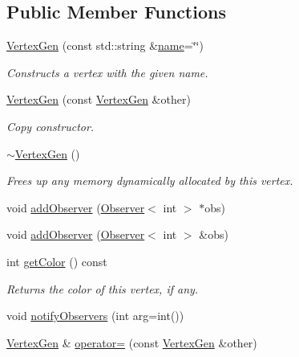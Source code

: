 \subsection*{Public Member Functions}
\begin{DoxyCompactItemize}
\item 
\mbox{\hyperlink{classVertexGen_a9432a8935c355d36bb1f64e5e17d94de}{Vertex\+Gen}} (const std\+::string \&\mbox{\hyperlink{classVertexGen_a9b45b3e13bd9167aab02e17e08916231}{name}}=\char`\"{}\char`\"{})
\begin{DoxyCompactList}\small\item\em Constructs a vertex with the given name. \end{DoxyCompactList}\item 
\mbox{\hyperlink{classVertexGen_a90c7c6069978d9c96447e2b693bd7662}{Vertex\+Gen}} (const \mbox{\hyperlink{classVertexGen}{Vertex\+Gen}} \&other)
\begin{DoxyCompactList}\small\item\em Copy constructor. \end{DoxyCompactList}\item 
\mbox{\hyperlink{classVertexGen_a7e615c7ee4f1a16998cd37bfbf0071b3}{$\sim$\+Vertex\+Gen}} ()
\begin{DoxyCompactList}\small\item\em Frees up any memory dynamically allocated by this vertex. \end{DoxyCompactList}\item 
void \mbox{\hyperlink{classObservable_a7fa6df797eb4680c2776371f2937a1b2}{add\+Observer}} (\mbox{\hyperlink{classObserver}{Observer}}$<$ int $>$ $\ast$obs)
\item 
void \mbox{\hyperlink{classObservable_a49fbc8dd9a3300429f7f575dc7ba0be8}{add\+Observer}} (\mbox{\hyperlink{classObserver}{Observer}}$<$ int $>$ \&obs)
\item 
int \mbox{\hyperlink{classVertexGen_a0a56fe92b545a9b650fe5cde9a756ea7}{get\+Color}} () const
\begin{DoxyCompactList}\small\item\em Returns the color of this vertex, if any. \end{DoxyCompactList}\item 
void \mbox{\hyperlink{classObservable_a337380718b992689248fac2927145c62}{notify\+Observers}} (int arg=int())
\item 
\mbox{\hyperlink{classVertexGen}{Vertex\+Gen}} \& \mbox{\hyperlink{classVertexGen_aa22afb123ae6fddef177390c73b90fd4}{operator=}} (const \mbox{\hyperlink{classVertexGen}{Vertex\+Gen}} \&other)

\end{DoxyCompactItemize}
